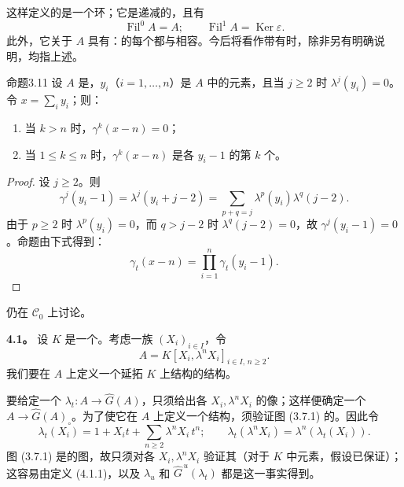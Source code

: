 这样定义的是一个环；它是递减的，且有
\[
\operatorname{Fil}^0A=A;\qquad\operatorname{Fil}^1A=\operatorname{Ker}\varepsilon.
\]
此外，它关于 $A$ 具有：的每个都与相容。今后将看作带有时，除非另有明确说明，均指上述。

\begin{SGAresult}{命题}{3.11}
设 $A$ 是，$y_i$（$i=1,\ldots,n$）是 $A$ 中的元素，且当 $j\geqslant2$ 时 $\lambda^j(y_i)=0$。令 $x=\sum_i y_i$；则：
\begin{enumerate}
\item[i)] 当 $k>n$ 时，$\gamma^k(x-n)=0$；
\item[ii)] 当 $1\leqslant k\leqslant n$ 时，$\gamma^k(x-n)$ 是各 $y_i-1$ 的第 $k$ 个。
\end{enumerate}
\end{SGAresult}
\begin{proof}
设 $j\geqslant2$。则
\[
\gamma^j(y_i-1)=\lambda^j(y_i+j-2)
=\sum_{p+q=j}\lambda^p(y_i)\lambda^q(j-2).
\]
由于 $p\geqslant2$ 时 $\lambda^p(y_i)=0$，而 $q>j-2$ 时 $\lambda^q(j-2)=0$，故 $\gamma^j(y_i-1)=0$。命题由下式得到：
\[
\gamma_t(x-n)=\prod_{i=1}^n\gamma_t(y_i-1).
\]
\end{proof}

仍在 $\mathscr C_0$ 上讨论。

\textbf{4.1。} 设 $K$ 是一个。考虑一族 $(X_i)_{i\in I}$，令
\[
A=K[X_i,\lambda^nX_i]_{i\in I,\,n\geqslant2}.
\]
我们要在 $A$ 上定义一个延拓 $K$ 上结构的结构。

要给定一个 $\lambda_t:A\longrightarrow\widehat G(A)$，只须给出各 $X_i,\lambda^nX_i$ 的像；这样便确定一个 $A\longrightarrow\widehat G(A)_\circ$。为了使它在 $A$ 上定义一个结构，须验证图 (3.7.1) 的。因此令
\[
\lambda_t(X_i)=1+X_it+\sum_{n\geqslant2}\lambda^nX_i\,t^n;
\qquad
\lambda_t(\lambda^nX_i)=\lambda^n(\lambda_t(X_i)).
\tag{4.1.1}
\]
图 (3.7.1) 是的图，故只须对各 $X_i,\lambda^nX_i$ 验证其（对于 $K$ 中元素，假设已保证）；这容易由定义 (4.1.1)，以及 $\lambda_u$ 和 $\widehat G^{\,u}(\lambda_t)$ 都是这一事实得到。

